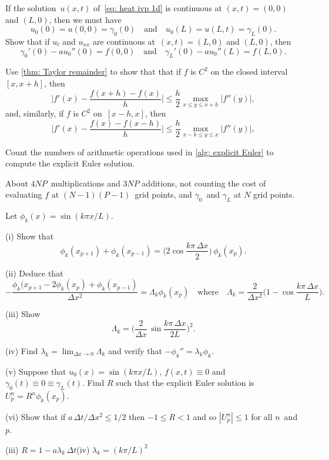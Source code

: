 \begin{Exercises}

\exercise
If the solution~$u(x,t)$ of~\eqref{eq: heat ivp 1d} is continuous
at $(x,t)=(0,0)$ and $(L,0)$, then we must have
\[
u_0(0)=u(0,0)=\gamma_0(0)\quad\text{and}\quad
u_0(L)=u(L,t)=\gamma_L(0).
\]
Show that if $u_t$ and $u_{xx}$ are continuous at~$(x,t)=(L,0)$ and $(L,0)$,
then
\[
\gamma_0'(0)-au_0''(0)=f(0,0)
\quad\text{and}\quad
\gamma_L'(0)-au_0''(L)=f(L,0).
\]

\exercise\label{ex: forward diff}
Use \cref{thm: Taylor remainder} to show that that if $f$ is $C^2$ on 
the closed interval~$[x,x+h]$, then
\[
\biggl|f'(x)-\frac{f(x+h)-f(x)}{h}\biggr|
	\le\frac{h}{2}\max_{x\le y\le x+h}|f''(y)|,
\]
and, similarly, if $f$ is $C^2$ on~$[x-h,x]$, then
\[
\biggl|f'(x)-\frac{f(x)-f(x-h)}{h}\biggr|
	\le\frac{h}{2}\max_{x-h\le y\le x}|f''(y)|,
\]

\exercise
Count the numbers of arithmetic operations used in \cref{alg: explicit Euler} 
to compute the explicit Euler solution.
\begin{ans}
About $4NP$~multiplications and $3NP$ additions, not counting the cost of
evaluating $f$ at $(N-1)(P-1)$~grid points, and $\gamma_0$~and $\gamma_L$
at $N$ grid points.
\end{ans}

\exercise
Let $\phi_k(x)=\sin(k\pi x/L)$.
\begin{description}
\item{(i)} Show that 
\[
\phi_k(x_{p+1})+\phi_k(x_{p-1})=\biggl(2\cos\frac{k\pi\,\Delta x}{2}\biggr)\,
	\phi_k(x_p).
\]
\item{(ii)} Deduce that
\[
-\frac{\phi_k(x_{p+1}-2\phi_k(x_p)+\phi_k(x_{p-1})}{\Delta x^2}
	=\Lambda_k\phi_k(x_p)\quad\text{where}\quad
\Lambda_k=\frac{2}{\Delta x^2}\biggl(1-\cos\frac{k\pi\,\Delta x}{L}\biggr).
\]
\item{(iii)} Show
\[
\Lambda_k=\biggl(\frac{2}{\Delta x}\,\sin\frac{k\pi\,\Delta x}{2L}\biggr)^2.
\]
\item{(iv)}
Find $\lambda_k=\lim_{\Delta x\to0}\Lambda_k$ and verify that 
$-\phi_k''=\lambda_k\phi_k$.
\item{(v)}
Suppose that $u_0(x)=\sin(k\pi x/L)$, $f(x,t)\equiv0$ and 
$\gamma_0(t)\equiv 0\equiv\gamma_L(t)$.  Find $R$ such that the explicit
Euler solution is~$U^n_p=R^n\phi_k(x_p)$.
\item{(vi)} Show that if $a\,\Delta t/\Delta x^2\le1/2$ then $-1\le R<1$
and so $|U^n_p|\le1$ for all $n$~and $p$.
\end{description}
\begin{ans}
(iii) $R=1-a\lambda_k\,\Delta t$\quad(iv) $\lambda_k=(k\pi/L)^2$
\end{ans}


\end{Exercises}
